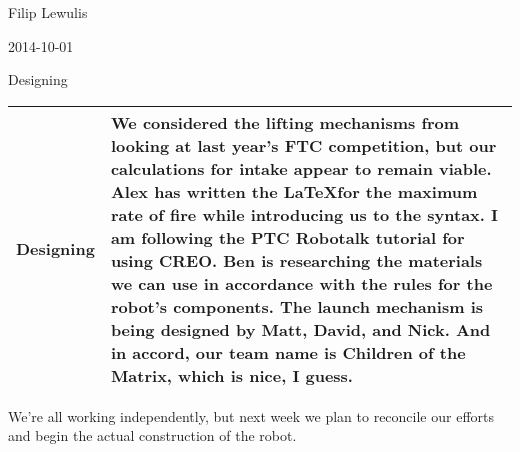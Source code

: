 Filip Lewulis

2014-10-01

Designing

\begin{tabular}{|p{2cm}|p{8cm}|}
\hline
 Designing&
 We considered the lifting mechanisms from looking at last year's FTC competition,
 but our calculations for intake appear to remain viable. Alex has written the \LaTeX for
 the maximum rate of fire while introducing us to the syntax. I am following the PTC Robotalk
 tutorial for using CREO. Ben is researching the materials we can use in accordance with the
 rules for the robot's components. The launch mechanism is being designed by Matt, David, and Nick.
 And in accord, our team name is \textbf{Children of the Matrix}, which is nice, I guess.
 \\
 \hline
\end{tabular}

We're all working independently, but next week we plan to reconcile our efforts and begin the
actual construction of the robot.
